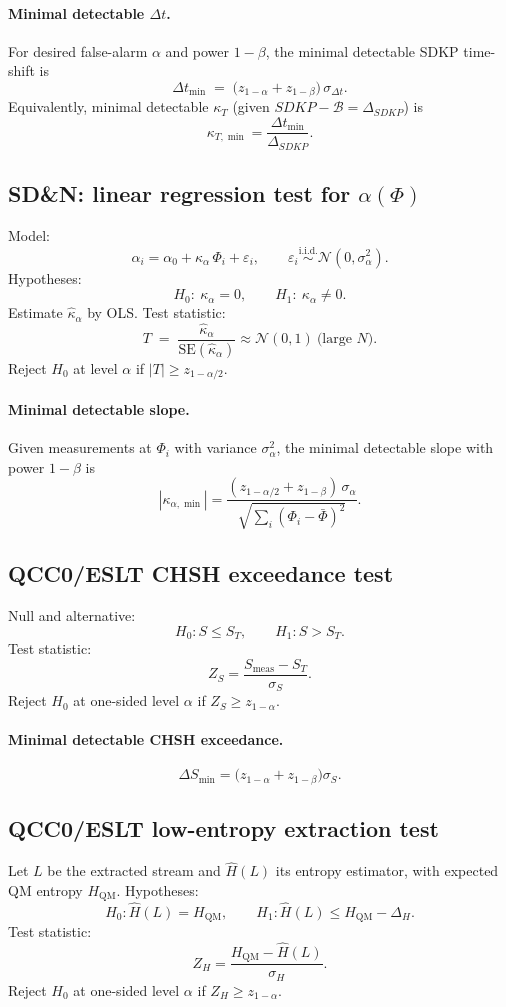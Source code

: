 \documentclass{article}
\begin{document}
\paragraph{Minimal detectable $\Delta t$.}
For desired false-alarm $\alpha$ and power $1-\beta$, the minimal detectable SDKP time-shift is
\[
\Delta t_{\min} \;=\; \big( z_{1-\alpha} + z_{1-\beta} \big)\,\sigma_{\Delta t}.
\]
Equivalently, minimal detectable $\kappa_T$ (given $S D K P - \mathcal{B} = \Delta_{SDKP}$) is
\[
\kappa_{T,\min} = \frac{\Delta t_{\min}}{\Delta_{SDKP}}.
\]

\subsection{SD\&N: linear regression test for $\alpha(\Phi)$}
Model:
\[
\alpha_i = \alpha_0 + \kappa_\alpha\,\Phi_i + \varepsilon_i,\qquad \varepsilon_i\overset{\text{i.i.d.}}{\sim}\mathcal{N}(0,\sigma_\alpha^2).
\]
Hypotheses:
\[
H_0:\ \kappa_\alpha=0,\qquad H_1:\ \kappa_\alpha\neq 0.
\]
Estimate $\widehat\kappa_\alpha$ by OLS. Test statistic:
\[
T \;=\; \frac{\widehat\kappa_\alpha}{\mathrm{SE}(\widehat\kappa_\alpha)} \approx \mathcal{N}(0,1)\ \text{(large }N).
\]
Reject $H_0$ at level $\alpha$ if $|T|\ge z_{1-\alpha/2}$.

\paragraph{Minimal detectable slope.}
Given measurements at $\Phi_i$ with variance $\sigma_\alpha^2$, the minimal detectable slope with power $1-\beta$ is
\[
|\kappa_{\alpha,\min}| = \frac{(z_{1-\alpha/2}+z_{1-\beta})\,\sigma_\alpha}{\sqrt{\sum_i(\Phi_i-\bar\Phi)^2}}.
\]

\subsection{QCC0/ESLT CHSH exceedance test}
Null and alternative:
\[
H_0: S \le S_T,\qquad H_1: S > S_T .
\]
Test statistic:
\[
Z_S = \frac{S_{\mathrm{meas}} - S_T}{\sigma_S}.
\]
Reject $H_0$ at one-sided level $\alpha$ if $Z_S \ge z_{1-\alpha}$.

\paragraph{Minimal detectable CHSH exceedance.}
\[
\Delta S_{\min} = \big(z_{1-\alpha}+z_{1-\beta}\big)\sigma_S.
\]

\subsection{QCC0/ESLT low-entropy extraction test}
Let $L$ be the extracted stream and $\widehat H(L)$ its entropy estimator, with expected QM entropy $H_{\mathrm{QM}}$.
Hypotheses:
\[
H_0: \widehat H(L) = H_{\mathrm{QM}},\qquad H_1: \widehat H(L) \le H_{\mathrm{QM}} - \Delta_H.
\]
Test statistic:
\[
Z_H = \frac{H_{\mathrm{QM}} - \widehat H(L)}{\sigma_H}.
\]
Reject $H_0$ at one-sided level $\alpha$ if $Z_H \ge z_{1-\alpha}$.
\end{document}
